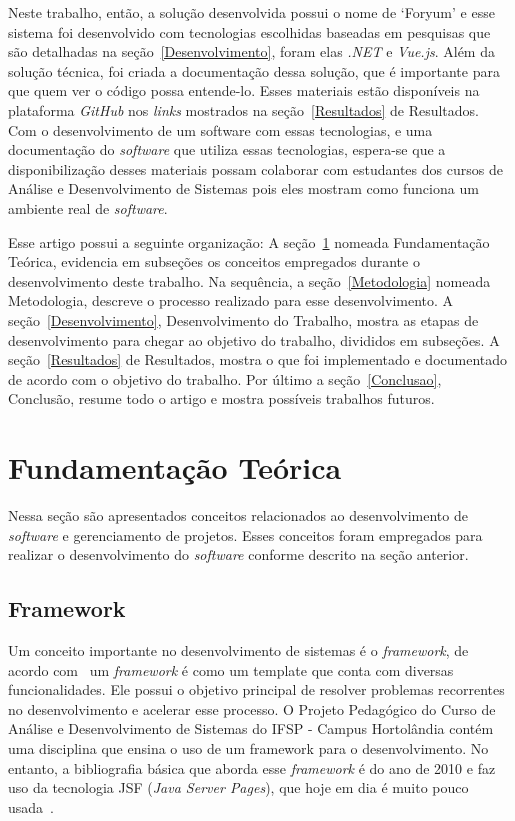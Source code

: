 \documentclass[12pt]{article}
\begin{document}
Neste trabalho, então, a solução desenvolvida possui o nome de `Foryum' e esse sistema foi desenvolvido
com tecnologias escolhidas baseadas em pesquisas que são detalhadas na seção~\ref{Desenvolvimento},
foram elas \textit{.NET} e \textit{Vue.js}. Além da solução técnica, foi criada a documentação dessa solução, que é
importante para que quem ver o código possa entende-lo. Esses materiais estão disponíveis na plataforma \textit{GitHub} nos
\textit{links} mostrados na seção~\ref{Resultados} de Resultados. Com o desenvolvimento de um software com essas tecnologias,
e uma documentação do \textit{software} que utiliza essas tecnologias, espera-se que a disponibilização desses materiais
possam colaborar com estudantes dos cursos de Análise e Desenvolvimento de Sistemas pois eles mostram como funciona um ambiente
real de \textit{software}.

Esse artigo possui a seguinte organização: A seção~\ref{FundamentacaoTeorica} nomeada Fundamentação Teórica,
evidencia em subseções os conceitos empregados durante o desenvolvimento deste trabalho. Na sequência,
a seção~\ref{Metodologia} nomeada Metodologia, descreve o processo realizado para esse desenvolvimento.
A seção~\ref{Desenvolvimento}, Desenvolvimento do Trabalho, mostra as etapas de desenvolvimento para chegar ao objetivo do trabalho, divididos em subseções.
A seção~\ref{Resultados} de Resultados, mostra o que foi implementado e documentado de acordo com o objetivo do trabalho.
Por último a seção~\ref{Conclusao}, Conclusão, resume todo o artigo e mostra possíveis trabalhos futuros.

\section{Fundamentação Teórica}\label{FundamentacaoTeorica}

Nessa seção são apresentados conceitos relacionados ao desenvolvimento de \textit{software} e gerenciamento
de projetos. Esses conceitos foram empregados para realizar o desenvolvimento do \textit{software} conforme descrito na seção anterior.

\subsection{Framework}

Um conceito importante no desenvolvimento de sistemas é o \textit{framework}, de acordo com~\cite{host12} um
\textit{framework} é como um template que conta com diversas funcionalidades. Ele possui o objetivo principal de
resolver problemas recorrentes no desenvolvimento e acelerar esse processo. O
Projeto Pedagógico do Curso de Análise e Desenvolvimento de Sistemas do IFSP - Campus Hortolândia
contém uma disciplina que ensina o uso de um framework para o desenvolvimento. No entanto, a bibliografia básica
que aborda esse \textit{framework} é do ano de 2010 e faz uso da tecnologia JSF (\textit{Java Server Pages}), que hoje em dia é muito pouco usada~\cite{webtechsurveyJSF}.
\end{document}
